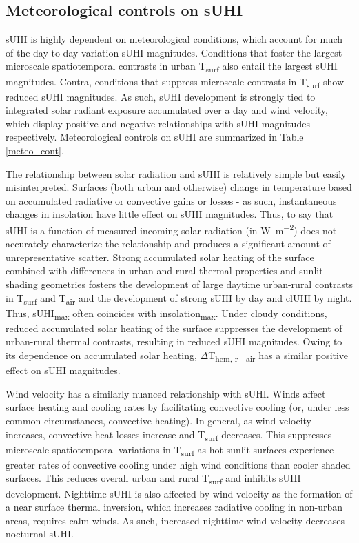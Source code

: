 \begin{bibunit}
\subsection{Meteorological controls on sUHI}

sUHI is highly dependent on meteorological conditions, which account for much of the day to day variation sUHI magnitudes. Conditions that foster the largest microscale spatiotemporal contrasts in urban T\textsubscript{surf} also entail the largest sUHI magnitudes. Contra, conditions that suppress microscale contrasts in T\textsubscript{surf} show reduced sUHI magnitudes. As such, sUHI development is strongly tied to integrated solar radiant exposure accumulated over a day and wind velocity, which display positive and negative relationships with sUHI magnitudes respectively. Meteorological controls on sUHI are summarized in Table \ref{meteo_cont}.

The relationship between solar radiation and sUHI is relatively simple but easily misinterpreted. Surfaces (both urban and otherwise) change in temperature based on accumulated radiative or convective gains or losses - as such, instantaneous changes in insolation have little effect on sUHI magnitudes. Thus, to say that sUHI is a function of measured incoming solar radiation (in \si{\watt\per\square\meter}) does not accurately characterize the relationship and produces a significant amount of unrepresentative scatter. Strong accumulated solar heating of the surface combined with differences in urban and rural thermal properties and sunlit shading geometries fosters the development of large daytime urban-rural contrasts in T\textsubscript{surf} and T\textsubscript{air} and the development of strong sUHI by day and clUHI by night. Thus, sUHI\textsubscript{max} often coincides with insolation\textsubscript{max}. Under cloudy conditions, reduced accumulated solar heating of the surface suppresses the development of urban-rural thermal contrasts, resulting in reduced sUHI magnitudes. Owing to its dependence on accumulated solar heating, $\Delta$T\textsubscript{hem, r - air} has a similar positive effect on sUHI magnitudes. 

Wind velocity has a similarly nuanced relationship with sUHI. Winds affect surface heating and cooling rates by facilitating convective cooling (or, under less common circumstances, convective heating). In general, as wind velocity increases, convective heat losses increase and T\textsubscript{surf} decreases. This suppresses microscale spatiotemporal variations in T\textsubscript{surf} as hot sunlit surfaces experience greater rates of convective cooling under high wind conditions than cooler shaded surfaces. This reduces overall urban and rural T\textsubscript{surf} and inhibits sUHI development. Nighttime sUHI is also affected by wind velocity as the formation of a near surface thermal inversion, which increases radiative cooling in non-urban areas, requires calm winds. As such, increased nighttime wind velocity decreases nocturnal sUHI.


\end{bibunit}
